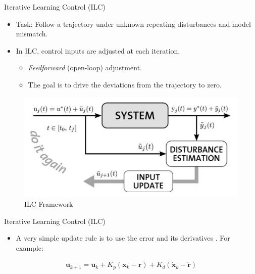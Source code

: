 \documentclass[handout]{beamer}
\newcommand{\state}{\mathbf{x}} %
\newcommand{\traj}{\mathbf{r}} %
\newcommand{\sysInput}{\mathbf{u}} %
\begin{document}
%
\begin{frame}{Iterative Learning Control (ILC)}
\begin{itemize}
\item Task: Follow a trajectory under unknown repeating disturbances and model mismatch. \cite{Survey} \pause
\item In ILC, control inputs are adjusted at each iteration. \pause
	\begin{itemize}
	\item \emph{Feedforward} (open-loop) adjustment. \pause
	\item The goal is to drive the deviations from the trajectory to zero. \pause
	\end{itemize}
\end{itemize}
\begin{figure}
\center
\includegraphics[scale=0.25]{ilc_framework}			
\caption{ILC Framework \cite{ILC_Angela}}
\end{figure}
\end{frame}
%
\begin{frame}{Iterative Learning Control (ILC)}
\begin{itemize}
\item A very simple update rule is to use the error and its derivatives \cite{Arimoto}. For example:
\end{itemize}
\begin{equation*}
\begin{aligned}
\sysInput_{k+1} = \sysInput_{k} + K_{p}(\state_{k} - \traj) + K_{d}(\dot{\state}_{k} - \dot{\traj})
\end{aligned}
\end{equation*}
\end{frame}
%
\end{document}
